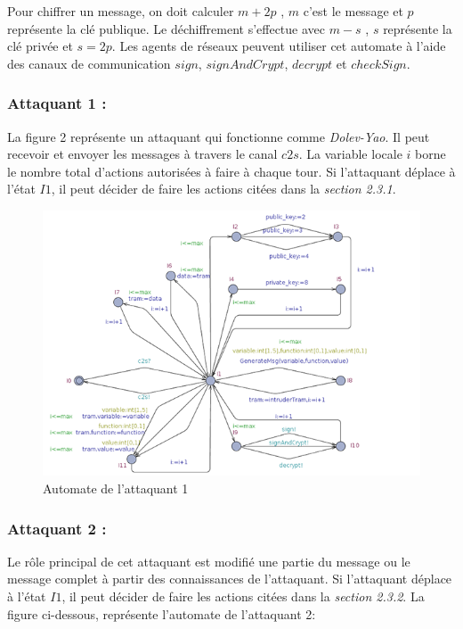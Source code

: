 \documentclass[10pt,a4paper]{article}
\begin{document}
Pour chiffrer un message, on doit calculer $m+2p$ , $m$ c'est le message et $p$ représente la clé publique. Le déchiffrement s'effectue avec $m-s$ , $s$ représente la clé privée et $s=2p$. Les agents de réseaux peuvent utiliser cet automate à l'aide des canaux de communication $sign$, $signAndCrypt$, $decrypt$ et $checkSign$.
\subsubsection{Attaquant 1 :}
La figure 2 représente un attaquant qui fonctionne comme \textit{Dolev-Yao}. Il peut recevoir et envoyer les messages à travers le canal $c2s$. La variable locale $i$ borne le nombre total d'actions autorisées à faire à chaque tour. Si l'attaquant déplace à l'état $I1$, il peut décider de faire les actions citées dans la \textit{section 2.3.1}.
      
\begin{figure}[!h]
\centering 
\includegraphics[scale=0.5]{img/attaquant1-600.png}
\caption{Automate de l'attaquant 1}
\end{figure}

\subsubsection{Attaquant 2 :}
Le rôle principal de cet attaquant est modifié une partie du message ou le message complet à partir des connaissances de l'attaquant. Si l'attaquant déplace à l'état $I1$, il peut décider de faire les actions citées dans la \textit{section 2.3.2}. La figure ci-dessous, représente l'automate de l'attaquant 2:  
\end{document}
